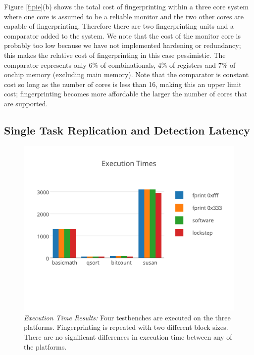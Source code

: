 	Figure \ref{f:pie}(b) shows the total cost of fingerprinting within a three core system where one core is assumed to be a reliable monitor and the two other cores are capable of fingerprinting.
	Therefore there are two fingerprinting units and a comparator added to the system.
	We note that the cost of the monitor core is probably too low because we have not implemented hardening or redundancy;
		this makes the relative cost of fingerprinting in this case pessimistic.
	The comparator represents only 6\% of combinationals, 4\% of registers and 7\% of onchip memory (excluding main memory).
	Note that the comparator is constant cost so long as the number of cores is less than 16, making this an upper limit cost;
		fingerprinting becomes more affordable the larger the number of cores that are supported.


\subsection{Single Task Replication and Detection Latency}

\begin{figure}[tb]
\centering
\includegraphics[scale=1.5]{Figures/execution_times}
\caption[Execution Time Results.]{\emph{Execution Time Results:} Four testbenches are executed on the three platforms. Fingerprinting is repeated with two different block sizes. There are no significant differences in execution time between any of the platforms.}
\label{f:extimes}
\end{figure}

